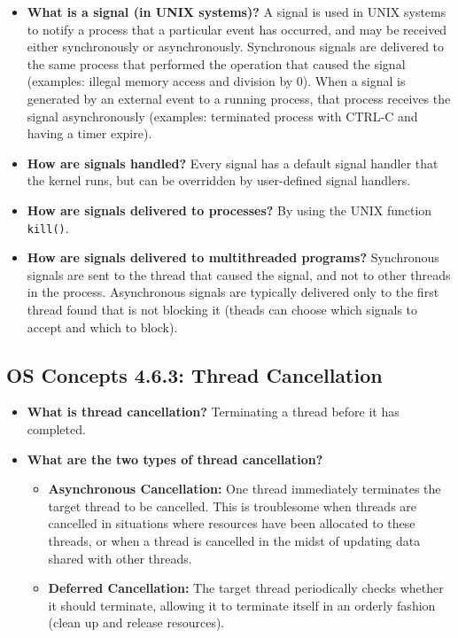 \documentclass[12pt]{article}
\begin{document}
\begin{itemize}
    \item \textbf{What is a signal (in UNIX systems)?} A signal is used in UNIX systems to notify a process that a particular event has occurred, and may be received either synchronously or asynchronously. Synchronous signals are delivered to the same process that performed the operation that caused the signal (examples: illegal memory access and division by 0). When a signal is generated by an external event to a running process, that process receives the signal asynchronously (examples: terminated process with CTRL-C and having a timer expire).
    \item \textbf{How are signals handled?} Every signal has a default signal handler that the kernel runs, but can be overridden by user-defined signal handlers.
    \item \textbf{How are signals delivered to processes?} By using the UNIX function \texttt{kill()}.
    \item \textbf{How are signals delivered to multithreaded programs?} Synchronous signals are sent to the thread that caused the signal, and not to other threads in the process. Asynchronous signals are typically delivered only to the first thread found that is not blocking it (theads can choose which signals to accept and which to block).
\end{itemize}

\subsection*{OS Concepts 4.6.3: Thread Cancellation}

\begin{itemize}
    \item \textbf{What is thread cancellation?} Terminating a thread before it has completed.
    \item \textbf{What are the two types of thread cancellation?}
        \begin{itemize}
            \item \textbf{Asynchronous Cancellation:} One thread immediately terminates the target thread to be cancelled. This is troublesome when threads are cancelled in situations where resources have been allocated to these threads, or when a thread is cancelled in the midst of updating data shared with other threads.
            \item \textbf{Deferred Cancellation:} The target thread periodically checks whether it should terminate, allowing it to terminate itself in an orderly fashion (clean up and release resources).
        \end{itemize}
\end{itemize}
\end{document}
